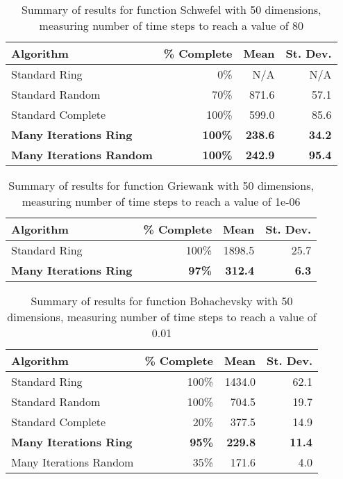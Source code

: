 \documentclass[smallcondensed]{svjour3}
\begin{document}
\begin{table}
  \caption{Summary of results for function Schwefel with 50 dimensions,
  measuring number of time steps to reach a value of 80}
  \label{tab:schwefel-50}
  \centering
  \begin{tabular}{|l|r|r|r|}
  \hline
  Algorithm&\% Complete&Mean&St. Dev.\\
  \hline
  \hline
  Standard Ring&0\%&N/A&N/A\\
  \hline
  Standard Random&70\%&871.6&57.1\\
  \hline
  Standard Complete&100\%&599.0&85.6\\
  \hline
  \textbf{Many Iterations Ring}&\textbf{100\%}&\textbf{238.6}&\textbf{34.2}\\
  \hline
  \textbf{Many Iterations Random}&\textbf{100\%}&\textbf{242.9}&\textbf{95.4}\\
  \hline
  \end{tabular}
\end{table}

\begin{table}
  \caption{Summary of results for function Griewank with 50 dimensions,
  measuring number of time steps to reach a value of 1e-06}
  \label{tab:griewank-50}
  \centering
  \begin{tabular}{|l|r|r|r|}
  \hline
  Algorithm&\% Complete&Mean&St. Dev.\\
  \hline
  \hline
  Standard Ring&100\%&1898.5&25.7\\
  \hline
  \textbf{Many Iterations Ring}&\textbf{97\%}&\textbf{312.4}&\textbf{6.3}\\
  \hline
  \end{tabular}
\end{table}

\begin{table}
  \caption{Summary of results for function Bohachevsky with 50 dimensions,
  measuring number of time steps to reach a value of 0.01}
  \label{tab:bohachevsky-50}
  \centering
  \begin{tabular}{|l|r|r|r|}
  \hline
  Algorithm&\% Complete&Mean&St. Dev.\\
  \hline
  \hline
  Standard Ring&100\%&1434.0&62.1\\
  \hline
  Standard Random&100\%&704.5&19.7\\
  \hline
  Standard Complete&20\%&377.5&14.9\\
  \hline
  \textbf{Many Iterations Ring}&\textbf{95\%}&\textbf{229.8}&\textbf{11.4}\\
  \hline
  Many Iterations Random&35\%&171.6&4.0\\
  \hline
  \end{tabular}
\end{table}
\end{document}
